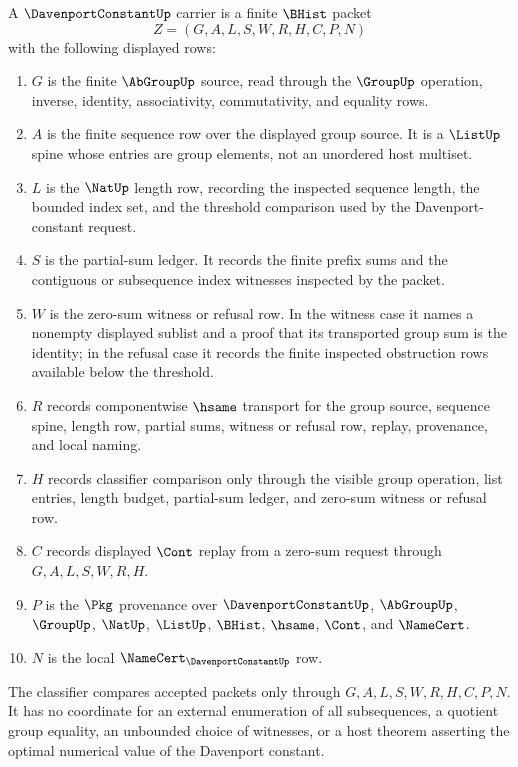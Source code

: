 \begin{definition}
\label{def:davenport-constant-carrier}
A $\DavenportConstantUp$ carrier is a finite $\BHist$ packet
$$
Z=(G,A,L,S,W,R,H,C,P,N)
$$
with the following displayed rows:
\begin{enumerate}
\item $G$ is the finite $\AbGroupUp$ source, read through the $\GroupUp$ operation, inverse, identity, associativity, commutativity, and equality rows.
\item $A$ is the finite sequence row over the displayed group source. It is a $\ListUp$ spine whose entries are group elements, not an unordered host multiset.
\item $L$ is the $\NatUp$ length row, recording the inspected sequence length, the bounded index set, and the threshold comparison used by the Davenport-constant request.
\item $S$ is the partial-sum ledger. It records the finite prefix sums and the contiguous or subsequence index witnesses inspected by the packet.
\item $W$ is the zero-sum witness or refusal row. In the witness case it names a nonempty displayed sublist and a proof that its transported group sum is the identity; in the refusal case it records the finite inspected obstruction rows available below the threshold.
\item $R$ records componentwise $\hsame$ transport for the group source, sequence spine, length row, partial sums, witness or refusal row, replay, provenance, and local naming.
\item $H$ records classifier comparison only through the visible group operation, list entries, length budget, partial-sum ledger, and zero-sum witness or refusal row.
\item $C$ records displayed $\Cont$ replay from a zero-sum request through $G,A,L,S,W,R,H$.
\item $P$ is the $\Pkg$ provenance over $\DavenportConstantUp$, $\AbGroupUp$, $\GroupUp$, $\NatUp$, $\ListUp$, $\BHist$, $\hsame$, $\Cont$, and $\NameCert$.
\item $N$ is the local $\NameCert_{\DavenportConstantUp}$ row.
\end{enumerate}
The classifier compares accepted packets only through $G,A,L,S,W,R,H,C,P,N$. It has no coordinate for an external enumeration of all subsequences, a quotient group equality, an unbounded choice of witnesses, or a host theorem asserting the optimal numerical value of the Davenport constant.
\end{definition}

